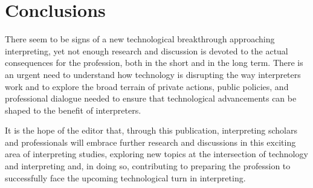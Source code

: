 \documentclass[output=paper]{langsci/langscibook}
\begin{document}
\section{Conclusions} 
 
There seem to be signs of a new technological breakthrough approaching interpreting, yet not enough research and discussion is devoted to the actual consequences for the profession, both in the short and in the long term. There is an urgent need to understand how technology is disrupting the way interpreters work and to explore the broad terrain of private actions, public policies, and professional dialogue needed to ensure that technological advancements can be shaped to the benefit of interpreters. 

It is the hope of the editor that, through this publication, interpreting scholars and professionals will embrace further research and discussions in this exciting area of interpreting studies, exploring new topics at the intersection of technology and interpreting and, in doing so, contributing to preparing the profession to successfully face the upcoming technological turn in interpreting.  

\sloppy
\printbibliography[heading=subbibliography,notkeyword=this]
\end{document}
